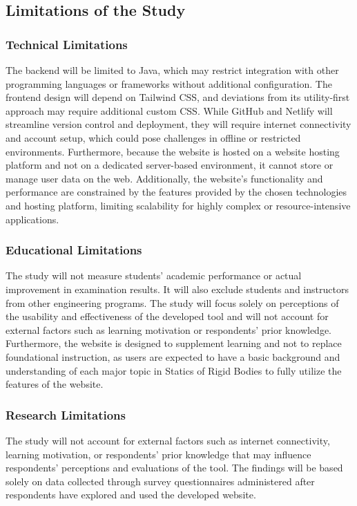 \subsection*{Limitations of the Study}

\subsubsection*{Technical Limitations}

The backend will be limited to Java, which may restrict integration 
with other programming languages or frameworks without additional 
configuration. The frontend design will depend on Tailwind CSS, and 
deviations from its utility-first approach may require additional 
custom CSS. While GitHub and Netlify will streamline version control 
and deployment, they will require internet connectivity and account 
setup, which could pose challenges in offline or restricted 
environments. Furthermore, because the website is hosted on a website 
hosting platform and not on a dedicated server-based environment, it 
cannot store or manage user data on the web. Additionally, the 
website's functionality and performance are constrained by the 
features provided by the chosen technologies and hosting platform, 
limiting scalability for highly complex or resource-intensive 
applications.

\subsubsection*{Educational Limitations}

The study will not measure students' academic performance or actual 
improvement in examination results. It will also exclude students and 
instructors from other engineering programs. The study will focus 
solely on perceptions of the usability and effectiveness of the 
developed tool and will not account for external factors such as 
learning motivation or respondents' prior knowledge. Furthermore, the 
website is designed to supplement learning and not to replace 
foundational instruction, as users are expected to have a basic 
background and understanding of each major topic in Statics of Rigid 
Bodies to fully utilize the features of the website.

\subsubsection*{Research Limitations}

The study will not account for external factors such as internet 
connectivity, learning motivation, or respondents' prior knowledge 
that may influence respondents' perceptions and evaluations of the 
tool. The findings will be based solely on data collected through 
survey questionnaires administered after respondents have explored 
and used the developed website.

